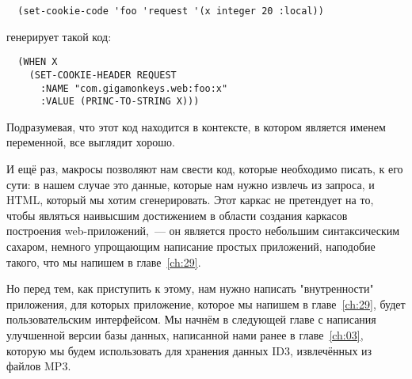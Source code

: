 \begin{lstlisting}
  (set-cookie-code 'foo 'request '(x integer 20 :local))
\end{lstlisting}

генерирует такой код:

\begin{lstlisting}
  (WHEN X
    (SET-COOKIE-HEADER REQUEST
      :NAME "com.gigamonkeys.web:foo:x"
      :VALUE (PRINC-TO-STRING X)))
\end{lstlisting}

Подразумевая, что этот код находится в контексте, в котором  является именем
переменной, все выглядит хорошо.

И ещё раз, макросы позволяют нам свести код, которые необходимо писать, к его сути: в
нашем случае это данные, которые нам нужно извлечь из запроса, и HTML, который мы хотим
сгенерировать. Этот каркас не претендует на то, чтобы являться наивысшим достижением в
области создания каркасов построения web-приложений,~--- он является просто небольшим
синтаксическим сахаром, немного упрощающим написание простых приложений, наподобие такого,
что мы напишем в главе~\ref{ch:29}.

Но перед тем, как приступить к этому, нам нужно написать "внутренности" приложения, для
которых приложение, которое мы напишем в главе~\ref{ch:29}, будет пользовательским
интерфейсом. Мы начнём в следующей главе с написания улучшенной версии базы данных,
написанной нами ранее в главе~\ref{ch:03}, которую мы будем использовать для хранения
данных ID3, извлечённых из файлов MP3.

